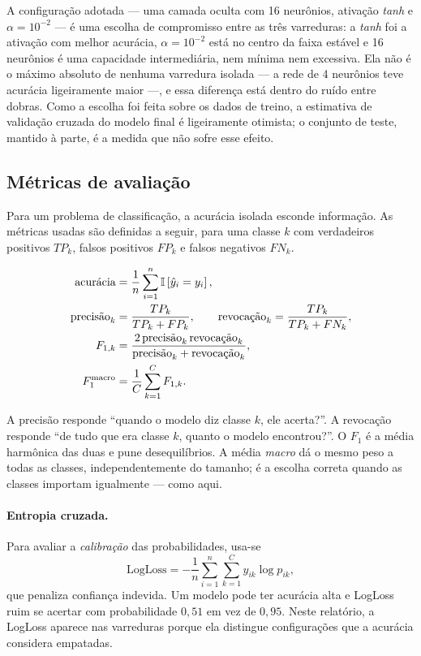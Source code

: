 A configuração adotada --- uma camada oculta com 16 neurônios, ativação \emph{tanh} e
$\alpha = 10^{-2}$ --- é uma escolha de compromisso entre as três varreduras: a \emph{tanh} foi a
ativação com melhor acurácia, $\alpha = 10^{-2}$ está no centro da faixa estável e 16 neurônios é
uma capacidade intermediária, nem mínima nem excessiva. Ela não é o máximo absoluto de nenhuma
varredura isolada --- a rede de 4 neurônios teve acurácia ligeiramente maior ---, e essa diferença
está dentro do ruído entre dobras. Como a escolha foi feita sobre os dados de treino, a estimativa
de validação cruzada do modelo final é ligeiramente otimista; o conjunto de teste, mantido à
parte, é a medida que não sofre esse efeito.

\subsection{Métricas de avaliação}
\label{sec:metricas}

Para um problema de classificação, a acurácia isolada esconde informação. As métricas usadas são
definidas a seguir, para uma classe $k$ com verdadeiros positivos $TP_k$, falsos positivos $FP_k$
e falsos negativos $FN_k$.

\begin{align}
	\text{acurácia} &= \frac{1}{n}\sum_{i=1}^{n}\mathbb{I}\left[\hat{y}_i = y_i\right],
	\label{eq:acc}\\
	\text{precisão}_k &= \frac{TP_k}{TP_k+FP_k}, \qquad
	\text{revocação}_k = \frac{TP_k}{TP_k+FN_k},
	\label{eq:pr}\\
	F_{1,k} &= \frac{2\,\text{precisão}_k\,\text{revocação}_k}{\text{precisão}_k+\text{revocação}_k},
	\label{eq:f1}\\
	F_1^{\text{macro}} &= \frac{1}{C}\sum_{k=1}^{C} F_{1,k}. \label{eq:f1macro}
\end{align}

A precisão responde ``quando o modelo diz classe $k$, ele acerta?''. A revocação responde ``de
tudo que era classe $k$, quanto o modelo encontrou?''. O $F_1$ é a média harmônica das duas e pune
desequilíbrios. A média \emph{macro} dá o mesmo peso a todas as classes, independentemente do
tamanho; é a escolha correta quando as classes importam igualmente --- como aqui.

\paragraph{Entropia cruzada.} Para avaliar a \emph{calibração} das probabilidades, usa-se
\begin{equation}
	\text{LogLoss} = -\frac{1}{n}\sum_{i=1}^{n}\sum_{k=1}^{C} y_{ik}\log p_{ik},
	\label{eq:logloss}
\end{equation}
que penaliza confiança indevida. Um modelo pode ter acurácia alta e LogLoss ruim se acertar com
probabilidade $0{,}51$ em vez de $0{,}95$. Neste relatório, a LogLoss aparece nas varreduras
porque ela distingue configurações que a acurácia considera empatadas.

